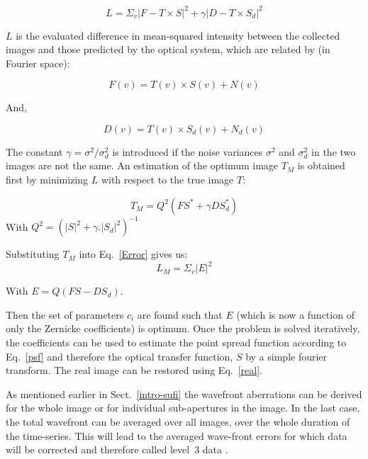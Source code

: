 \documentclass[goettingen, gauss, print]{thesis}
\begin{document}
\begin{equation}
L = \Sigma_v |F-T \times S|^2 + \gamma|D-T \times S_d|^2
\label{Error}
\end{equation}

$L$ is the evaluated difference in mean-squared intensity between the collected images and those predicted by the optical system, which are related by (in Fourier space):

\begin{equation}
F(v) = T(v)\times S(v) + N(v)
\end{equation}  

And,

\begin{equation}
D(v) = T(v)\times S_d(v) + N_d(v)
\end{equation}           

The constant $\gamma=\sigma^2/\sigma_d^2$ is introduced if the noise variances $\sigma^2$ and $\sigma_d^2$ in the two images are not the same. 
An estimation of the optimum image $T_M$ is obtained first by minimizing $L$ with respect to the true image $T$:

\begin{equation}
T_M = Q^2(FS^{*}+\gamma DS_d^{*})
\label{real}
\end{equation}
With $Q^2 = (|S|^2 + \gamma.|S_d|^2)^{-1} $

Substituting $T_M$ into Eq.~\ref{Error} gives us:
\begin{equation}
L_M = \Sigma_v |E|^2
\end{equation}

With $E = Q (FS-DS_d)$.

Then the set of parameters $c_i$ are found such that $E$ (which is now a function of only the Zernicke coefficients) is optimum.
Once the problem is solved iteratively, the coefficients can be used to estimate the point spread function according to Eq.~\ref{psf} and therefore the optical transfer function, $S$ by a simple fourier transform. The real image can be restored using Eq.~\ref{real}.

As mentioned earlier in Sect.~\ref{intro-sufi} the wavefront aberrations can be derived for the whole image or for individual sub-apertures in the image. In the last case, the total wavefront can be averaged over all images, over the whole duration of the time-series. This will lead to the averaged wave-front errors for which data will be corrected and therefore called level~$3$ data \citep{hirzberger_quiet-sun_2010,hirzberger_performance_2011}.
\end{document}
